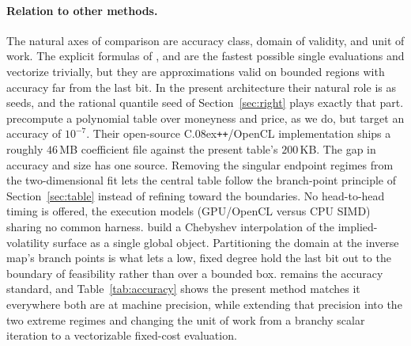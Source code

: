 \documentclass[11pt]{article}
\begin{document}
\paragraph{Relation to other methods.}
The natural axes of comparison are accuracy class, domain of validity, and unit of work. The explicit formulas of \citet{li2008approximate}, \citet{stefanica2017explicit} and \citet{xiacui2018exact} are the fastest possible single evaluations and vectorize trivially, but they are approximations valid on bounded regions with accuracy far from the last bit. In the present architecture their natural role is as seeds, and the rational quantile seed of Section~\ref{sec:right} plays exactly that part. \citet{matic2019pde} precompute a polynomial table over moneyness and price, as we do, but target an accuracy of $10^{-7}$. Their open-source C\raise.08ex\hbox{\tt ++}/OpenCL implementation ships a roughly $46$\,MB coefficient file against the present table's $200$\,KB. The gap in accuracy and size has one source. Removing the singular endpoint regimes from the two-dimensional fit lets the central table follow the branch-point principle of Section~\ref{sec:table} instead of refining toward the boundaries. No head-to-head timing is offered, the execution models (GPU/OpenCL versus CPU SIMD) sharing no common harness. \citet{glau2019chebyshev} build a Chebyshev interpolation of the implied-volatility surface as a single global object. Partitioning the domain at the inverse map's branch points is what lets a low, fixed degree hold the last bit out to the boundary of feasibility rather than over a bounded box. \citet{jackel2015rational} remains the accuracy standard, and Table~\ref{tab:accuracy} shows the present method matches it everywhere both are at machine precision, while extending that precision into the two extreme regimes and changing the unit of work from a branchy scalar iteration to a vectorizable fixed-cost evaluation.
\end{document}
